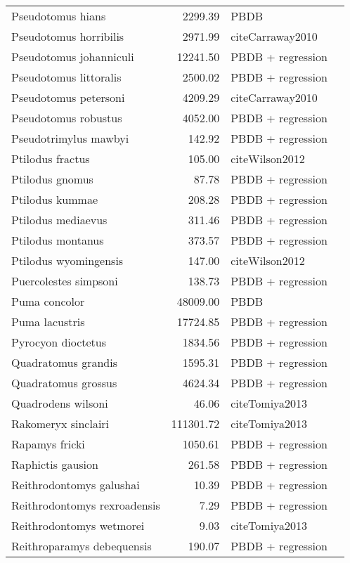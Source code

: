 \begin{table}[ht]
\begin{tabular}{lrll}
  Pseudotomus hians & 2299.39 & PBDB &  \\ 
  Pseudotomus horribilis & 2971.99 & cite{Carraway2010} &  \\ 
  Pseudotomus johanniculi & 12241.50 & PBDB + regression &  \\ 
  Pseudotomus littoralis & 2500.02 & PBDB + regression &  \\ 
  Pseudotomus petersoni & 4209.29 & cite{Carraway2010} &  \\ 
  Pseudotomus robustus & 4052.00 & PBDB + regression &  \\ 
  Pseudotrimylus mawbyi & 142.92 & PBDB + regression &  \\ 
  Ptilodus fractus & 105.00 & cite{Wilson2012} &  \\ 
  Ptilodus gnomus & 87.78 & PBDB + regression &  \\ 
  Ptilodus kummae & 208.28 & PBDB + regression &  \\ 
  Ptilodus mediaevus & 311.46 & PBDB + regression &  \\ 
  Ptilodus montanus & 373.57 & PBDB + regression &  \\ 
  Ptilodus wyomingensis & 147.00 & cite{Wilson2012} &  \\ 
  Puercolestes simpsoni & 138.73 & PBDB + regression &  \\ 
  Puma concolor & 48009.00 & PBDB &  \\ 
  Puma lacustris & 17724.85 & PBDB + regression &  \\ 
  Pyrocyon dioctetus & 1834.56 & PBDB + regression &  \\ 
  Quadratomus grandis & 1595.31 & PBDB + regression &  \\ 
  Quadratomus grossus & 4624.34 & PBDB + regression &  \\ 
  Quadrodens wilsoni & 46.06 & cite{Tomiya2013} &  \\ 
  Rakomeryx sinclairi & 111301.72 & cite{Tomiya2013} &  \\ 
  Rapamys fricki & 1050.61 & PBDB + regression &  \\ 
  Raphictis gausion & 261.58 & PBDB + regression &  \\ 
  Reithrodontomys galushai & 10.39 & PBDB + regression &  \\ 
  Reithrodontomys rexroadensis & 7.29 & PBDB + regression &  \\ 
  Reithrodontomys wetmorei & 9.03 & cite{Tomiya2013} &  \\ 
  Reithroparamys debequensis & 190.07 & PBDB + regression &  \\ 

\end{tabular}
\end{table}
